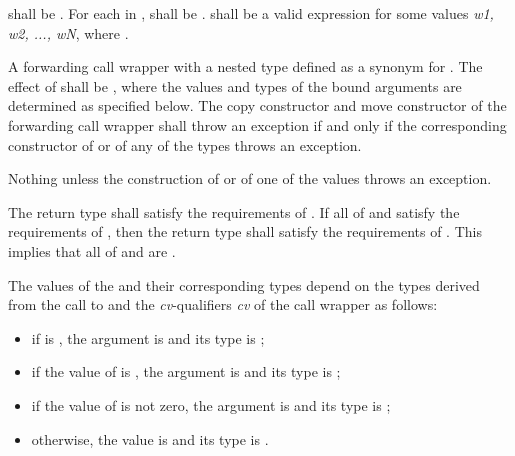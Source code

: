 \begin{itemdescr}
\pnum
\requires
{} shall be . For each 
in ,  shall be .
 shall be  a valid
expression for some
values \textit{w1, w2, ..., wN}, where
.

\pnum
\returns A forwarding call wrapper  with a nested  type
 defined as a synonym for .  The effect of
 shall be , where the values and types of the bound
arguments  are determined as specified below.
The copy constructor and move constructor of the forwarding call wrapper shall throw an
exception if and only if the corresponding constructor of  or of any of the types
 throws an exception.

\pnum
\throws Nothing unless the construction of
 or of one of the values  throws an exception.

\pnum
\notes The return type shall satisfy the requirements of . If all
of  and  satisfy the requirements of , then the
return type shall satisfy the requirements of . \enternote This implies
that all of  and  are . \exitnote
\end{itemdescr}

\pnum
{}%
The values of the   and their
corresponding types  depend on the
types  derived from
the call to  and the
\textit{cv}-qualifiers \textit{cv} of the call wrapper  as follows:

\begin{itemize}
\item if  is , the
argument is  and its type  is ;

\item if the value of 
is , the argument is   and its
type  is
;

\item if the value  of 
is not zero, the  argument is 
and its type 
is ;

\item otherwise, the value is  and its type 
is .
\end{itemize}

